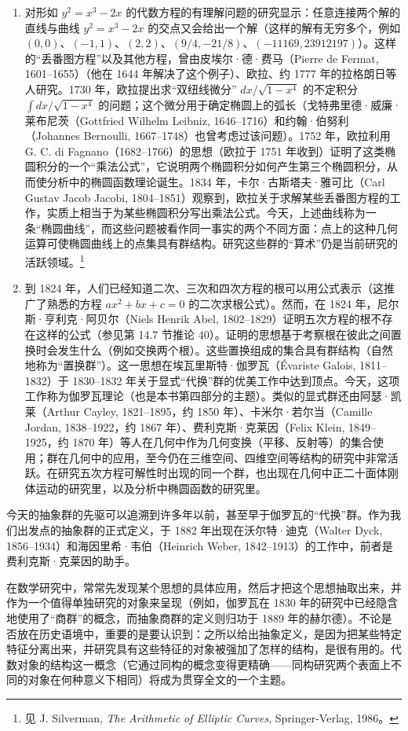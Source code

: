 \documentclass{book}
\begin{document}
{\begin{enumerate}[label=(\arabic*)]
 		\item 对形如 $y^2=x^3-2x$ 的代数方程的有理解问题的研究显示：任意连接两个解的直线与曲线 $y^2=x^3-2x$ 的交点又会给出一个解（这样的解有无穷多个，例如 $(0,0)$、$(-1,1)$、$(2,2)$、$(9/4,-21/8)$、$(-11169,23912197)$）。这样的“丢番图方程”以及其他方程，曾由皮埃尔·德·费马（Pierre de Fermat, 1601--1655）（他在 1644 年解决了这个例子）、欧拉、约 1777 年的拉格朗日等人研究。1730 年，欧拉提出求“双纽线微分” $dx/\sqrt{1-x^4}$ 的不定积分 $\int dx/\sqrt{1-x^4}$ 的问题；这个微分用于确定椭圆上的弧长（戈特弗里德·威廉·莱布尼茨（Gottfried Wilhelm Leibniz, 1646--1716）和约翰·伯努利（Johannes Bernoulli, 1667--1748）也曾考虑过该问题）。1752 年，欧拉利用 G. C. di Fagnano（1682--1766）的思想（欧拉于 1751 年收到）证明了这类椭圆积分的一个“乘法公式”，它说明两个椭圆积分如何产生第三个椭圆积分，从而使分析中的椭圆函数理论诞生。1834 年，卡尔·古斯塔夫·雅可比（Carl Gustav Jacob Jacobi, 1804--1851）观察到，欧拉关于求解某些丢番图方程的工作，实质上相当于为某些椭圆积分写出乘法公式。今天，上述曲线称为一条“椭圆曲线”，而这些问题被看作同一事实的两个不同方面：点上的这种几何运算可使椭圆曲线上的点集具有群结构。研究这些群的“算术”仍是当前研究的活跃领域。\footnote{见 J. Silverman, \textit{The Arithmetic of Elliptic Curves}, Springer-Verlag, 1986。}
 		
 		\item 到 1824 年，人们已经知道二次、三次和四次方程的根可以用公式表示（这推广了熟悉的方程 $ax^2+bx+c=0$ 的二次求根公式）。然而，在 1824 年，尼尔斯·亨利克·阿贝尔（Niels Henrik Abel, 1802--1829）证明五次方程的根不存在这样的公式（参见第 14.7 节推论 40）。证明的思想基于考察根在彼此之间置换时会发生什么（例如交换两个根）。这些置换组成的集合具有群结构（自然地称为“置换群”）。这一思想在埃瓦里斯特·伽罗瓦（\'Evariste Galois, 1811--1832）于 1830--1832 年关于显式“代换”群的优美工作中达到顶点。今天，这项工作称为伽罗瓦理论（也是本书第四部分的主题）。类似的显式群还由阿瑟·凯莱（Arthur Cayley, 1821--1895，约 1850 年）、卡米尔·若尔当（Camille Jordan, 1838--1922，约 1867 年）、费利克斯·克莱因（Felix Klein, 1849--1925，约 1870 年）等人在几何中作为几何变换（平移、反射等）的集合使用；群在几何中的应用，至今仍在三维空间、四维空间等结构的研究中非常活跃。在研究五次方程可解性时出现的同一个群，也出现在几何中正二十面体刚体运动的研究里，以及分析中椭圆函数的研究里。
 	\end{enumerate}
 	
 	今天的抽象群的先驱可以追溯到许多年以前，甚至早于伽罗瓦的“代换”群。作为我们出发点的抽象群的正式定义，于 1882 年出现在沃尔特·迪克（Walter Dyck, 1856--1934）和海因里希·韦伯（Heinrich Weber, 1842--1913）的工作中，前者是费利克斯·克莱因的助手。
 	
 	在数学研究中，常常先发现某个思想的具体应用，然后才把这个思想抽取出来，并作为一个值得单独研究的对象来呈现（例如，伽罗瓦在 1830 年的研究中已经隐含地使用了“商群”的概念，而抽象商群的定义则归功于 1889 年的赫尔德）。不论是否放在历史语境中，重要的是要认识到：之所以给出抽象定义，是因为把某些特定特征分离出来，并研究具有这些特征的对象被强加了怎样的结构，是很有用的。代数对象的结构这一概念（它通过同构的概念变得更精确——同构研究两个表面上不同的对象在何种意义下相同）将成为贯穿全文的一个主题。
 }
\end{document}
